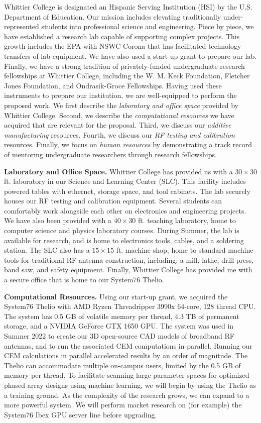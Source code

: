 \documentclass[11pt]{amsart}
\begin{document}
Whittier College is designated an Hispanic Serving Institution (HSI) by the U.S. Department of Education.  Our mission includes elevating traditionally under-represented students into professional science and engineering.  Piece by piece, we have established a research lab capable of supporting complex projects.  This growth includes the EPA with NSWC Corona that has facilitated technology transfers of lab equipment.  We have also used a start-up grant to prepare our lab.  Finally, we have a strong tradition of privately-funded undergraduate research fellowships at Whittier College, including the W. M. Keck Foundation, Fletcher Jones Foundation, and Ondrasik-Groce Fellowships.  Having used these instruments to prepare our institution, we are well-equipped to perform the proposed work.  We first describe the \textit{laboratory and office space} provided by Whittier College.  Second, we describe the \textit{computational resources} we have acquired that are relevant for the proposal.  Third, we discuss our \textit{additive manufacturing} resources.  Fourth, we discuss our \textit{RF testing and calibration} resources.  Finally, we focus on \textit{human resources} by demonstrating a track record of mentoring undergraduate researchers through research fellowships. 

\textbf{Laboratory and Office Space.} Whittier College has provided us with a $30 \times 30$ ft. laboratory in our Science and Learning Center (SLC).  This facility includes powered tables with ethernet, storage space, and tool cabinets.  The lab securely houses our RF testing and calibration equipment.  Several students can comfortably work alongside each other on electronics and engineering projects.  We have also been provided with a $40 \times 30$ ft. teaching laboratory, home to computer science and physics laboratory courses.  During Summer, the lab is available for research, and is home to electronics tools, cables, and a soldering station.  The SLC also has a $15 \times 15$ ft. machine shop, home to standard machine tools for traditional RF antenna construction, including: a mill, lathe, drill press, band saw, and safety equipment.  Finally, Whittier College has provided me with a secure office that is home to our System76 Thelio. 

\textbf{Computational Resources.} Using our start-up grant, we acquired the System76 Thelio with AMD Ryzen Threadripper 3990x 64-core, 128 thread CPU.  The system has 0.5 GB of volatile memory per thread, 4.3 TB of permanent storage, and a NVIDIA GeForce GTX 1650 GPU.  The system was used in Summer 2022 to create our 3D open-source CAD models of broadband RF antennas, and to run the associated CEM computations in parallel.  Running our CEM calculations in parallel accelerated results by an order of magnitude.  The Thelio can accommodate multiple on-campus users, limited by the 0.5 GB of memory per thread.  To facilitate scanning large parameter spaces for optimized phased array designs using machine learning, we will begin by using the Thelio as a training ground.  As the complexity of the research grows, we can expand to a more powerful system.  We will perform market research on (for example) the System76 Ibex GPU server line before upgrading.  
\end{document}
